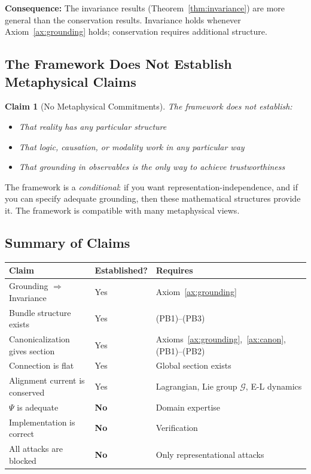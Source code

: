 \documentclass[12pt]{article}
\newtheorem{claim}{Claim}
\theoremstyle{definition}
\theoremstyle{remark}
\newcommand{\calG}{\mathcal{G}}
\begin{document}
\textbf{Consequence:} The invariance results (Theorem~\ref{thm:invariance}) are more general than the conservation results. Invariance holds whenever Axiom~\ref{ax:grounding} holds; conservation requires additional
structure.

\subsection{The Framework Does Not Establish Metaphysical Claims}

\begin{claim}[No Metaphysical Commitments]\label{claim:metaphysics}
The framework does not establish:
\begin{itemize}
    \item That reality has any particular structure
    \item That logic, causation, or modality work in any particular way
    \item That grounding in observables is the only way to achieve trustworthiness
\end{itemize}
\end{claim}

The framework is a \emph{conditional}: if you want representation-independence, and if you can
specify adequate grounding, then these mathematical structures provide it. The framework is
compatible with many metaphysical views.

\subsection{Summary of Claims}

\begin{table}[h]
\centering
\begin{tabular}{lll}
\toprule
\textbf{Claim} & \textbf{Established?} & \textbf{Requires} \\
\midrule
Grounding $\Rightarrow$ Invariance & Yes & Axiom~\ref{ax:grounding} \\
Bundle structure exists & Yes & (PB1)--(PB3) \\
Canonicalization gives section & Yes & Axioms~\ref{ax:grounding},~\ref{ax:canon}, (PB1)--(PB2) \\
Connection is flat & Yes & Global section exists \\
Alignment current is conserved & Yes & Lagrangian, Lie group $\calG$, E-L dynamics \\
$\Psi$ is adequate & \textbf{No} & Domain expertise \\
Implementation is correct & \textbf{No} & Verification \\
All attacks are blocked & \textbf{No} & Only representational attacks \\
\bottomrule
\end{tabular}
\end{table}
\end{document}
